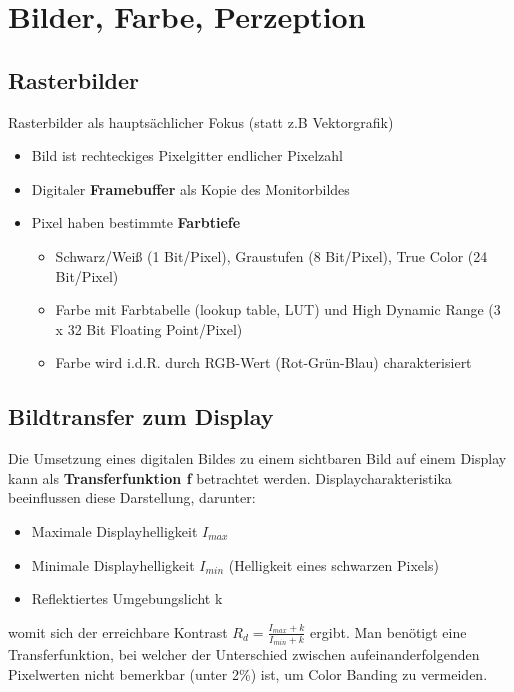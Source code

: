 \section{Bilder, Farbe, Perzeption}%
\label{bfp:sec:bilder_farbe_perzeption}

\subsection{Rasterbilder}%
\label{bfp:sub:rasterbilder}

Rasterbilder als hauptsächlicher Fokus (statt z.B Vektorgrafik)
\begin{itemize}
	\item Bild ist rechteckiges Pixelgitter endlicher Pixelzahl
	\item Digitaler \textbf{Framebuffer} als Kopie des Monitorbildes
	\item Pixel haben bestimmte \textbf{Farbtiefe}
	\begin{itemize}
		\item Schwarz/Weiß (1 Bit/Pixel), Graustufen (8 Bit/Pixel), True Color (24 Bit/Pixel)
		\item Farbe mit Farbtabelle (lookup table, \glqq LUT\grqq) und High Dynamic Range (3 x 32 Bit Floating Point/Pixel)
		\item Farbe wird i.d.R. durch RGB-Wert (Rot-Grün-Blau) charakterisiert
	\end{itemize}
\end{itemize}

\subsection{Bildtransfer zum Display}%
\label{bfp:sub:bildtransfer_zum_display}

Die Umsetzung eines digitalen Bildes zu einem sichtbaren Bild auf einem Display kann als \textbf{Transferfunktion f} betrachtet werden. Displaycharakteristika beeinflussen diese Darstellung, darunter:
\begin{itemize}
	\item Maximale Displayhelligkeit $I_{max}$
	\item Minimale Displayhelligkeit $I_{min}$ (Helligkeit eines schwarzen Pixels)
	\item Reflektiertes Umgebungslicht k
\end{itemize}
womit sich der erreichbare Kontrast $R_d = \frac{I_{max} + k}{I_{min} + k}$ ergibt. Man benötigt eine Transferfunktion, bei welcher der Unterschied zwischen aufeinanderfolgenden Pixelwerten nicht bemerkbar (unter 2\%) ist, um Color Banding zu vermeiden.

